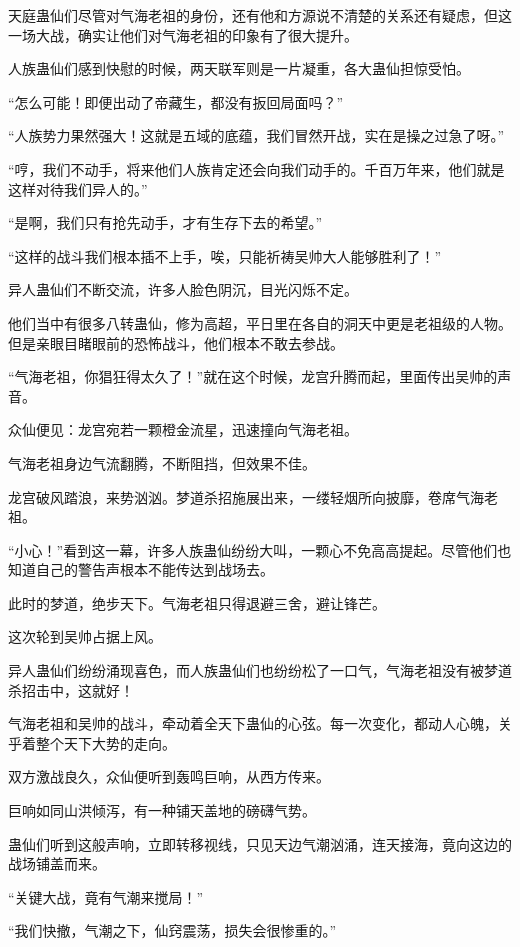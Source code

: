 \begin{this_body}
天庭蛊仙们尽管对气海老祖的身份，还有他和方源说不清楚的关系还有疑虑，但这一场大战，确实让他们对气海老祖的印象有了很大提升。

人族蛊仙们感到快慰的时候，两天联军则是一片凝重，各大蛊仙担惊受怕。

“怎么可能！即便出动了帝藏生，都没有扳回局面吗？”

“人族势力果然强大！这就是五域的底蕴，我们冒然开战，实在是操之过急了呀。”

“哼，我们不动手，将来他们人族肯定还会向我们动手的。千百万年来，他们就是这样对待我们异人的。”

“是啊，我们只有抢先动手，才有生存下去的希望。”

“这样的战斗我们根本插不上手，唉，只能祈祷吴帅大人能够胜利了！”

异人蛊仙们不断交流，许多人脸色阴沉，目光闪烁不定。

他们当中有很多八转蛊仙，修为高超，平日里在各自的洞天中更是老祖级的人物。但是亲眼目睹眼前的恐怖战斗，他们根本不敢去参战。

“气海老祖，你猖狂得太久了！”就在这个时候，龙宫升腾而起，里面传出吴帅的声音。

众仙便见：龙宫宛若一颗橙金流星，迅速撞向气海老祖。

气海老祖身边气流翻腾，不断阻挡，但效果不佳。

龙宫破风踏浪，来势汹汹。梦道杀招施展出来，一缕轻烟所向披靡，卷席气海老祖。

“小心！”看到这一幕，许多人族蛊仙纷纷大叫，一颗心不免高高提起。尽管他们也知道自己的警告声根本不能传达到战场去。

此时的梦道，绝步天下。气海老祖只得退避三舍，避让锋芒。

这次轮到吴帅占据上风。

异人蛊仙们纷纷涌现喜色，而人族蛊仙们也纷纷松了一口气，气海老祖没有被梦道杀招击中，这就好！

气海老祖和吴帅的战斗，牵动着全天下蛊仙的心弦。每一次变化，都动人心魄，关乎着整个天下大势的走向。

双方激战良久，众仙便听到轰鸣巨响，从西方传来。

巨响如同山洪倾泻，有一种铺天盖地的磅礴气势。

蛊仙们听到这般声响，立即转移视线，只见天边气潮汹涌，连天接海，竟向这边的战场铺盖而来。

“关键大战，竟有气潮来搅局！”

“我们快撤，气潮之下，仙窍震荡，损失会很惨重的。”


\end{this_body}
